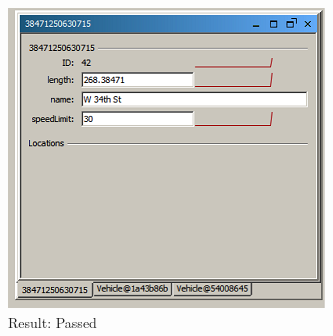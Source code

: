 \documentclass[11pt, oneside]{article}   	%
\begin{document}
\begin{itemize}
\includegraphics{Sim}\hfill \\
Result: Passed
\end{itemize}
\end{document}
